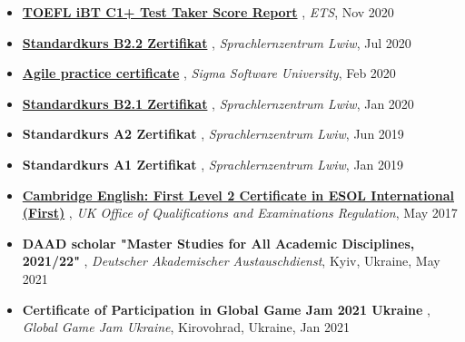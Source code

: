 \documentclass[letterpaper,10pt]{article}
\newcommand{\titleItem}[1]{
  \textbf{#1}
}
\begin{document}
\begin{itemize}[leftmargin=0.15in, label={}]
    \item
			\titleItem{\href{https://drive.google.com/file/d/1XL6SUxIYBzqoSwck5ZSPzK3rQbgAqewI/view?usp=sharing}{{TOEFL iBT C1+ Test Taker Score Report}}}, \emph{ETS}, Nov 2020
			\vspace{-9pt}
		
    \item
			\titleItem{\href{https://drive.google.com/file/d/1RlLSvM_3e2ge_CuGSYeGQfTOlzlmEYdH/view?usp=sharing}{{Standardkurs B2.2 Zertifikat}}}, \emph{Sprachlernzentrum Lwiw}, Jul 2020
			\vspace{-9pt}
		
    \item
			\titleItem{\href{https://drive.google.com/file/d/1LTYpV6Q1HNzGcMxh6HO4tlEtwELc0Pta/view?usp=sharing}{{Agile practice certificate}}}, \emph{Sigma Software University}, Feb 2020
			\vspace{-9pt}
		
    \item
			\titleItem{\href{https://drive.google.com/open?id=17kmCOkC1snH8HCPZ8kAo2MOrqXi1my6P}{{Standardkurs B2.1 Zertifikat}}}, \emph{Sprachlernzentrum Lwiw}, Jan 2020
			\vspace{-9pt}
		
    \item
			\titleItem{Standardkurs A2 Zertifikat}, \emph{Sprachlernzentrum Lwiw}, Jun 2019
			\vspace{-9pt}
		
    \item
			\titleItem{Standardkurs A1 Zertifikat}, \emph{Sprachlernzentrum Lwiw}, Jan 2019
			\vspace{-9pt}
		
    \item
			\titleItem{\href{https://drive.google.com/file/d/1qcIYSFNIVZ2rZL4G9o46xJTBmrIXxtuM/view?usp=sharing}{{Cambridge English: First Level 2 Certificate in ESOL International (First)}}}, \emph{UK Office of Qualifications and Examinations Regulation}, May 2017
			\vspace{-9pt}
		
\par\hrulefill

    \item
			\titleItem{DAAD scholar "Master Studies for All Academic Disciplines, 2021/22"}, \emph{Deutscher Akademischer Austauschdienst}, {Kyiv, Ukraine}, May 2021
			\vspace{-9pt}
		
    \item
			\titleItem{Certificate of Participation in Global Game Jam 2021 Ukraine}, \emph{Global Game Jam Ukraine}, {Kirovohrad, Ukraine}, Jan 2021
			\vspace{-9pt}
		

\end{itemize}
\end{document}
